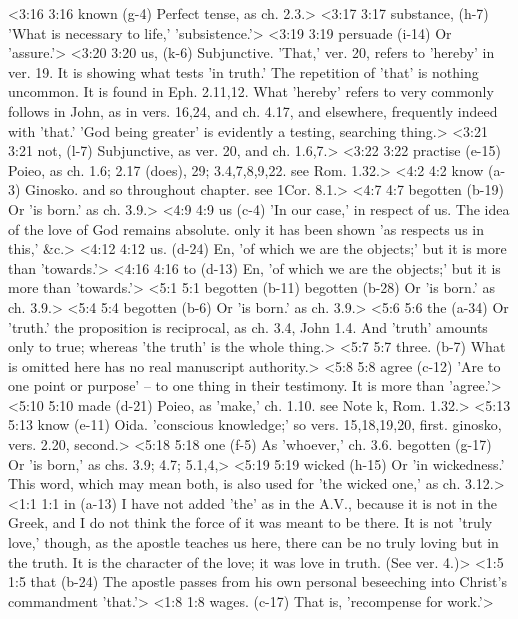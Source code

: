 <3:16 3:16  known (g-4)  Perfect tense, as ch. 2.3.>
<3:17 3:17  substance, (h-7)  'What is necessary to life,' 'subsistence.'>
<3:19 3:19  persuade (i-14)  Or 'assure.'>
<3:20 3:20  us, (k-6)  Subjunctive. 'That,' ver. 20, refers to 'hereby' in ver. 19.  It is showing what tests 'in truth.' The repetition of 'that'  is nothing uncommon. It is found in Eph. 2.11,12. What 'hereby'  refers to very commonly follows in John, as in vers. 16,24, and  ch. 4.17, and elsewhere, frequently indeed with 'that.' 'God  being greater' is evidently a testing, searching thing.>
<3:21 3:21  not, (l-7)  Subjunctive, as ver. 20, and ch. 1.6,7.>
<3:22 3:22  practise (e-15)  Poieo, as ch. 1.6; 2.17 (does), 29; 3.4,7,8,9,22. see Rom. 1.32.>
<4:2 4:2  know (a-3)  Ginosko. and so throughout chapter. see 1Cor. 8.1.>
<4:7 4:7  begotten (b-19)  Or 'is born.' as ch. 3.9.>
<4:9 4:9  us (c-4)  'In our case,' in respect of us. The idea of the love of God  remains absolute. only it has been shown 'as respects us in  this,' &c.>
<4:12 4:12  us. (d-24)  En, 'of which we are the objects;' but it is more than  'towards.'>
<4:16 4:16  to (d-13)  En, 'of which we are the objects;' but it is more than  'towards.'>
<5:1 5:1  begotten (b-11)  begotten (b-28)
  Or 'is born.' as ch. 3.9.>
<5:4 5:4  begotten (b-6)  Or 'is born.' as ch. 3.9.>
<5:6 5:6  the (a-34)  Or 'truth.' the proposition is reciprocal, as ch. 3.4, John 1.4.  And 'truth' amounts only to true; whereas 'the truth' is  the whole thing.>
<5:7 5:7  three. (b-7)  What is omitted here has no real manuscript authority.>
<5:8 5:8  agree (c-12)  'Are to one point or purpose' -- to one thing in their  testimony. It is more than 'agree.'>
<5:10 5:10  made (d-21)  Poieo, as 'make,' ch. 1.10. see Note k, Rom. 1.32.>
<5:13 5:13  know (e-11)  Oida. 'conscious knowledge;' so vers. 15,18,19,20, first.  ginosko, vers. 2.20, second.>
<5:18 5:18  one (f-5)  As 'whoever,' ch. 3.6.
  begotten (g-17)  Or 'is born,' as chs. 3.9; 4.7; 5.1,4,>
<5:19 5:19  wicked (h-15)  Or 'in wickedness.' This word, which may mean both, is also  used for 'the wicked one,' as ch. 3.12.>
<1:1 1:1  in (a-13)  I have not added 'the' as in the A.V., because it is not in  the Greek, and I do not think the force of it was meant to be  there. It is not 'truly love,' though, as the apostle teaches  us here, there can be no truly loving but in the truth. It is  the character of the love; it was love in truth. (See ver. 4.)>
<1:5 1:5  that (b-24)  The apostle passes from his own personal beseeching into  Christ's commandment 'that.'>
<1:8 1:8  wages. (c-17)  That is, 'recompense for work.'>
